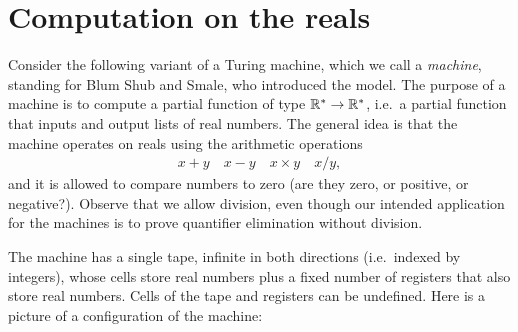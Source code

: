 \section{Computation on the reals}
\label{sec:bss}
Consider the following variant of a Turing machine, which we call a \emph{\bss machine}, standing for Blum Shub and Smale, who introduced the model. The purpose of a  \bss machine is to compute a  partial function  of type $\mathbb R^* \to \mathbb R^*$, i.e.~a partial function that inputs and output lists of real numbers. The general idea is that the machine operates on reals using the arithmetic operations 
\begin{align*}
x+y \quad x -y \quad x \times y \quad x / y,
\end{align*}
and it is allowed to compare numbers to zero (are they zero, or positive, or negative?). Observe that we allow division, even though our intended application for the machines is to prove quantifier elimination without division.

The machine has a single tape, infinite in both directions (i.e.~indexed by integers), whose  cells store real numbers  plus a fixed number  of registers that also store real numbers. Cells of the tape and registers can be undefined. Here is a picture of a configuration of the machine: 


